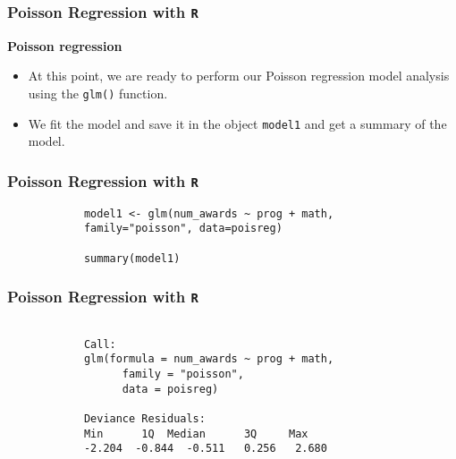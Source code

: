 \documentclass[MASTER.tex]{subfiles}
\begin{document}
	
	\begin{frame}[fragile]
		
		\frametitle{Poisson Regression with \texttt{R}}
		\Large
		
		\textbf{Poisson regression}
		\begin{itemize}
			\item At this point, we are ready to perform our Poisson regression model analysis using the \texttt{glm()} function. 
			\item We fit the model and save it in the object \texttt{model1} and get a summary of the model.
		\end{itemize}
	\end{frame}
	
	\begin{frame}[fragile]
		
		\frametitle{Poisson Regression with \texttt{R}}
		\large
		\begin{framed}
			\begin{verbatim}
			model1 <- glm(num_awards ~ prog + math, 
			family="poisson", data=poisreg)
			
			summary(model1)
			\end{verbatim}
		\end{framed}
	\end{frame}
	\begin{frame}[fragile]
		\frametitle{Poisson Regression with \texttt{R}}
	
		\begin{framed}
			\begin{verbatim}
			
			Call:
			glm(formula = num_awards ~ prog + math, 
			      family = "poisson", 
			      data = poisreg)
			               
			Deviance Residuals: 
			Min      1Q  Median      3Q     Max  
			-2.204  -0.844  -0.511   0.256   2.680  
			\end{verbatim}
		\end{framed}
	\end{frame}
	
\end{document}
